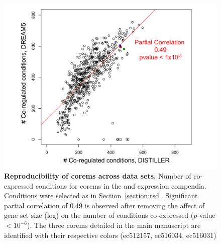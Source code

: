 \begin{figure}[h!]
\centering
\includegraphics[width=0.6\linewidth]{figures/corem_conds_distiller_dream5.pdf}
\caption[Reproducibility of corems across data sets]{
\textbf{Reproducibility of corems across data sets.} 
Number of co-expressed conditions for corems in the 
and  expression compendia. Conditions were selected as
in Section~\ref{section:rsd}. Significant partial correlation of 0.49
is observed after removing the affect of gene set size (log) on
the number of conditions co-expressed ($p$-value $< 10^{-6}$). The
three corems detailed in the main manuscript are identified with their
respective colors ({\color{red}ec512157}, {\color{blue}ec516034},
{\color{green}ec516031})}
\label{fig:corem_conds_distiller_dream5}
\end{figure}

